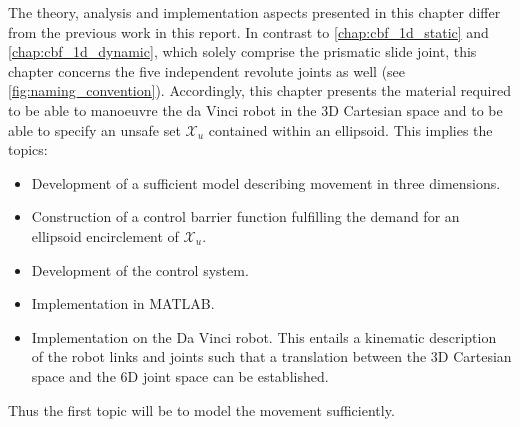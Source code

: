%
The theory, analysis and implementation aspects presented in this chapter differ from the previous work in this report. In contrast to \autoref{chap:cbf_1d_static} and \autoref{chap:cbf_1d_dynamic}, which solely comprise the prismatic slide joint, this chapter concerns the five independent revolute joints as well (see \autoref{fig:naming_convention}). Accordingly, this chapter presents the material required to be able to manoeuvre the da Vinci robot in the 3D Cartesian space and to be able to specify an unsafe set $\mathcal{X}_u$ contained within an ellipsoid. This implies the topics:
\begin{itemize}
	\itemsep-0.7mm
\item Development of a sufficient model describing movement in three dimensions.
\item Construction of a control barrier function fulfilling the demand for an ellipsoid encirclement of $\mathcal{X}_u$.
\item Development of the control system.
\item Implementation in MATLAB.
\item Implementation on the Da Vinci robot. This entails a kinematic description of the robot links and joints such that a translation between the 3D Cartesian space and the 6D joint space can be established.
\end{itemize}
Thus the first topic will be to model the movement sufficiently.
